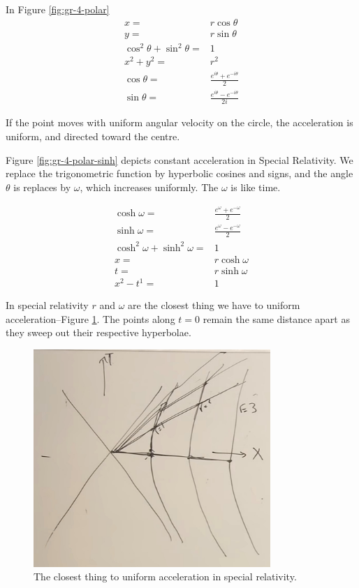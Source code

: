 \documentclass[]{article}
\begin{document}
{In Figure \ref{fig:gr-4-polar}
\begin{align*}
	x=& r \cos \theta\\
	y=& r \sin \theta\\
	\cos^2 \theta + \sin^2 \theta =& 1\\
	x^2 + y^2 =& r^2\\
	\cos \theta =& \frac{e^{i \theta}+e^{-i \theta}}{2}\\
	\sin \theta =& \frac{e^{i \theta}-e^{-i \theta}}{2i}
\end{align*}

If the point moves with uniform angular velocity on the circle, the acceleration is uniform, and directed toward the centre.

Figure \ref{fig:gr-4-polar-sinh} depicts constant acceleration in Special Relativity. We replace the trigonometric function by hyperbolic cosines and signs, and the angle $\theta$ is replaces by $\omega$, which increases uniformly. The $\omega$ is like time.

\begin{align*}
	\cosh \omega =& \frac{e^\omega+e^{-\omega}}{2}\\
	\sinh \omega =& \frac{e^\omega-e^{-\omega}}{2}\\
	\cosh^2 \omega +\sinh^2 \omega=& 1\\
	x=& r \cosh \omega\\
	t=& r \sinh \omega\\
	x^2 - t^1 =& 1
\end{align*}

In special relativity $r$ and $\omega$ are the closest thing we have to uniform acceleration--Figure \ref{fig:gr-4-uniform-sinh}. The points along $t=0$ remain the same distance apart as they sweep out their respective hyperbolae.

\begin{figure}[H]
	\begin{center}
		\caption{The closest thing to uniform acceleration in special relativity.}\label{fig:gr-4-uniform-sinh}
		\includegraphics[width=0.8\textwidth]{gr-4-uniform-sinh}
	\end{center}
\end{figure}

}
\end{document}
